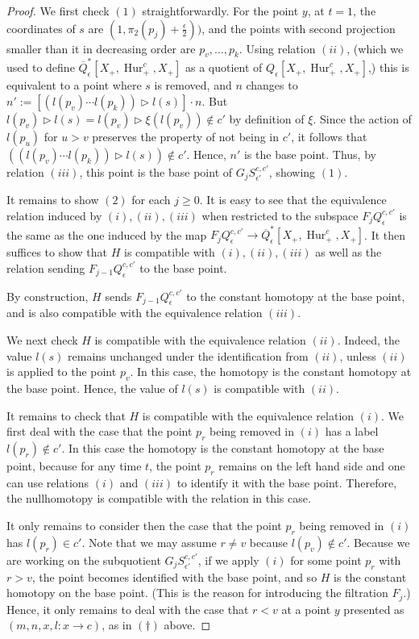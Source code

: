 \documentclass[12 pt]{amsart}
\theoremstyle{plain}
\theoremstyle{definition}
\theoremstyle{remark}
\numberwithin{equation}{section}
\DeclareMathOperator\Hur{Hur}
\begin{document}
\begin{proof}
We first check $(1)$ 
straightforwardly. For the point $y$, at $t=1$, the coordinates of $s$ are
$(1,\pi_2(p_j)+\frac {\epsilon } {2}))$, and the points with second
projection smaller than it in decreasing order are $p_v,\ldots, p_k$. Using
relation $(ii)$, 
(which we used to define $\overline{Q}^*_{\epsilon}[X_+,\Hur^{c}_+,X_+]$ as a quotient of
$Q_{\epsilon}[X_+,\Hur^{c}_+,X_+]$,) this is equivalent to a point where $s$ is removed, and $n$
changes to $n' :=[(l(p_v)\cdots l(p_k))\triangleright l(s)] \cdot n$. But
$l(p_v)\triangleright l(s) = l(p_v) \triangleright \xi(l(p_v)) \notin c'$ by
definition of $\xi$. Since the action of $l(p_u)$ for $u>v$ preserves the
property of not
being in $c'$, it follows that $((l(p_v)\cdots l(p_k))\triangleright l(s))
\notin c'$. Hence, $n'$ is the base point. Thus, by relation $(iii)$, this point
is the base point of $G_j S^{c,c'}_{\epsilon'}$, showing $(1)$.


	It remains to show $(2)$ for each $j\geq0$. It is easy to see that the equivalence relation induced by $(i),(ii),(iii)$ when restricted to the subspace $F_jQ_{\epsilon}^{c,c'}$ is the same as the one induced by the map $F_jQ_{\epsilon}^{c,c'} \to \overline{Q}^*_{\epsilon}[X_+,\Hur^{c}_+,X_+]$.
	It then suffices to show that $H$ is compatible with $(i),(ii),(iii)$ as well as the relation sending $F_{j-1}Q_{\epsilon}^{c,c'}$ to the base point.
	
	By construction,
	$H$ sends $F_{j-1}Q_{\epsilon}^{c,c'}$ to the constant homotopy at the base point, and is also compatible with the equivalence relation
	$(iii)$.

	We next check $H$ is compatible with the equivalence
	relation $(ii)$.
	Indeed, the value $l(s)$ remains unchanged under the
	identification from $(ii)$, unless $(ii)$ is applied to the point $p_v$. 
	In this case, the homotopy is the constant homotopy at the base point.
	Hence, the value of $l(s)$ is compatible with $(ii)$.

	It remains to check that $H$ is compatible with the equivalence relation $(i)$. 
	We first deal with the case that the point $p_r$ 
	being removed in $(i)$ has a label $l(p_r) \notin c'$. In this case the homotopy is the constant homotopy at the base point, 
	because for any time $t$, the point $p_r$ remains on the left hand side
	and one can use relations $(i)$ and $(iii)$ to identify it with the base
	point.
	Therefore, the nullhomotopy is compatible with
	the relation in this case.

	It only remains to consider then the case that
	the point $p_r$ being removed in $(i)$ has $l(p_r) \in c'$. 
	Note that we may assume $r \neq v$ because $l(p_v) \notin c'$.
	Because we are working on the subquotient
	$G_j S^{c,c'}_{\epsilon'}$, if we apply
	$(i)$ for some point $p_r$ with $r > v$, the point becomes identified
	with the base point, and so $H$ is the constant homotopy on the base point. (This is the reason for introducing the
	filtration $F_j$.)
	Hence, it only remains to deal with the case that $r < v$ at a point
	$y$ presented as $(m,n,x,l:x \to
	c)$, as in $(\dagger)$ above.


\end{proof}
\end{document}
